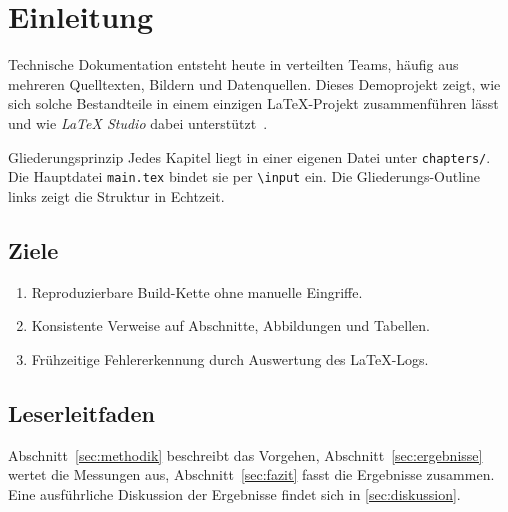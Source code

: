 \section{Einleitung}
\label{sec:intro}

Technische Dokumentation entsteht heute in verteilten Teams, häufig aus
mehreren Quelltexten, Bildern und Datenquellen. Dieses Demoprojekt zeigt, wie
sich solche Bestandteile in einem einzigen \LaTeX-Projekt zusammenführen lässt
und wie \emph{LaTeX Studio} dabei unterstützt~\cite{lamport1994}.

\begin{hinweis}{Gliederungsprinzip}
  Jedes Kapitel liegt in einer eigenen Datei unter \texttt{chapters/}. Die
  Hauptdatei \texttt{main.tex} bindet sie per \texttt{\textbackslash input}
  ein. Die Gliederungs-Outline links zeigt die Struktur in Echtzeit.
\end{hinweis}

\subsection{Ziele}
\label{sec:ziele}
\begin{enumerate}[leftmargin=*, label=\alph*)]
  \item Reproduzierbare Build-Kette ohne manuelle Eingriffe.
  \item Konsistente Verweise auf Abschnitte, Abbildungen und Tabellen.
  \item Frühzeitige Fehlererkennung durch Auswertung des \LaTeX-Logs.
\end{enumerate}

\subsection{Leserleitfaden}
Abschnitt~\ref{sec:methodik} beschreibt das Vorgehen,
Abschnitt~\ref{sec:ergebnisse} wertet die Messungen aus,
Abschnitt~\ref{sec:fazit} fasst die Ergebnisse zusammen. Eine ausführliche
Diskussion der Ergebnisse findet sich in \cref{sec:diskussion}.
